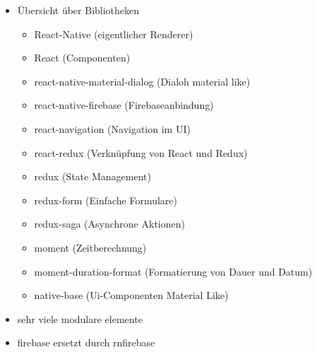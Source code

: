 \begin{itemize}
    \item Übersicht über Bibliotheken
    \begin{itemize}
        \item React-Native (eigentlicher Renderer)
        \item React (Componenten)
        \item react-native-material-dialog (Dialoh material like)
        \item react-native-firebase (Firebaseanbindung)
        \item react-navigation (Navigation im UI)
        \item react-redux (Verknüpfung von React und Redux)
        \item redux (State Management)
        \item redux-form (Einfache Formulare)
        \item redux-saga (Asynchrone Aktionen)
        \item moment (Zeitberechnung)
        \item moment-duration-format (Formatierung von Dauer und Datum)
        \item native-base (Ui-Componenten Material Like)
    \end{itemize}
    \item sehr viele modulare elemente
    \item firebase ersetzt durch rnfirebase
\end{itemize}